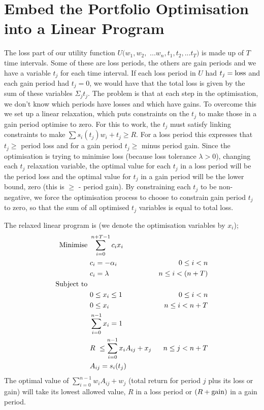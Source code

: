 \documentclass[12pt]{article}
\begin{document}
\section{Embed the Portfolio Optimisation into a Linear Program}
The loss part of our utility function $U(w_1,w_2,$ $...w_n,t_1,t_2,...t_T)$ is made up of $T$ time intervals. Some of these
are loss periods, the others are gain periods and we have a variable $t_j$ for each time interval. If each loss period in $U$ had $t_j = {\rm loss}$ and each gain period had
$t_j=0$, we would have that the total loss is given by the sum of these variables $\Sigma_j t_j$. The problem is that at each step in the optimisation,
we don't know which periods have losses and which have gains. To overcome this we set up a linear relaxation, which puts constraints on the $t_j$ to make those in a gain period optimise to zero.
For this to work, the $t_j$ must satisfy
linking constraints to make $\sum s_i( t_j )w_i +t_j \ge R$. For a loss period this expresses that $t_j \ge$ period loss and for a gain period
$t_j \ge$ minus period gain. Since the optimisation is trying to minimise loss (because loss tolerance $\lambda > 0$), changing each $t_j$ relaxation variable, the optimal value 
for each $t_j$ in a loss period will be the period loss and the optimal value for $t_j$ in a gain period will be the lower bound, zero (this is $\ge$ - period gain).
By constraining each $t_j$ to be non-negative, we force the optimisation process to choose to constrain gain period 
$t_j$ to zero, so that the sum of all optimised $t_j$ variables is equal to total loss.

The relaxed linear program is (we denote the optimisation variables by $x_i$);
\begin{align*}
    {\rm Minimise}\ & \sum_{i=0}^{n+T-1} c_i x_i\cr
    &c_i=-\alpha_i &0\le i < n\cr
    &c_i =\lambda &n\le i < (n+T)\cr
    {\rm Subject\ to}\ &\cr& 0 \le x_i \le 1\ &0\le i < n\cr
    & 0 \le x_i \ &n\le i < n+T\cr
    & \sum_{i=0}^{n-1} x_i = 1\cr
    & R\ \le\sum_{i=0}^{n-1} x_i A_{ij} + x_j  &n\le j < n+T\cr
    & A_{ij} = s_i(t_j )\cr
\end{align*}
The optimal value of $\sum_{i=0}^{n-1} w_i A_{ij} + w_j$ (total return for period $j$ plus its loss or gain) will take its lowest allowed value, $R$ in a loss period or $(R+{\rm gain})$ in a gain period.
\end{document}
